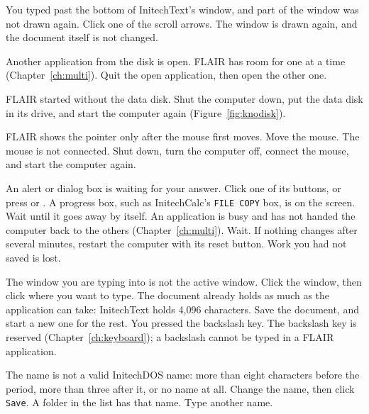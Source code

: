 \Cause You typed past the bottom of InitechText's window, and part of the
window was not drawn again.
\Solution Click one of the scroll arrows.  The window is drawn again, and
the document itself is not changed.

\Cause Another application from the disk is open.  FLAIR has room for one
at a time (Chapter~\ref{ch:multi}).
\Solution Quit the open application, then open the other one.

\Cause FLAIR started without the data disk.
\Solution Shut the computer down, put the data disk in its drive, and
start the computer again (Figure~\ref{fig:knodisk}).

\Cause FLAIR shows the pointer only after the mouse first moves.
\Solution Move the mouse.
\Cause The mouse is not connected.
\Solution Shut down, turn the computer off, connect the mouse, and start
the computer again.

\Cause An alert or dialog box is waiting for your answer.
\Solution Click one of its buttons, or press  or .
\Cause A progress box, such as InitechCalc's \texttt{FILE COPY} box, is on
the screen.
\Solution Wait until it goes away by itself.
\Cause An application is busy and has not handed the computer back to the
others (Chapter~\ref{ch:multi}).
\Solution Wait.  If nothing changes after several minutes, restart the
computer with its reset button.  Work you had not saved is lost.

\Cause The window you are typing into is not the active window.
\Solution Click the window, then click where you want to type.
\Cause The document already holds as much as the application can take:
InitechText holds 4,096 characters.
\Solution Save the document, and start a new one for the rest.
\Cause You pressed the backslash key.
\Solution The backslash key is reserved (Chapter~\ref{ch:keyboard}); a
backslash cannot be typed in a FLAIR application.

\Cause The name is not a valid InitechDOS name: more than eight characters
before the period, more than three after it, or no name at all.
\Solution Change the name, then click \texttt{Save}.
\Cause A folder in the list has that name.
\Solution Type another name.

